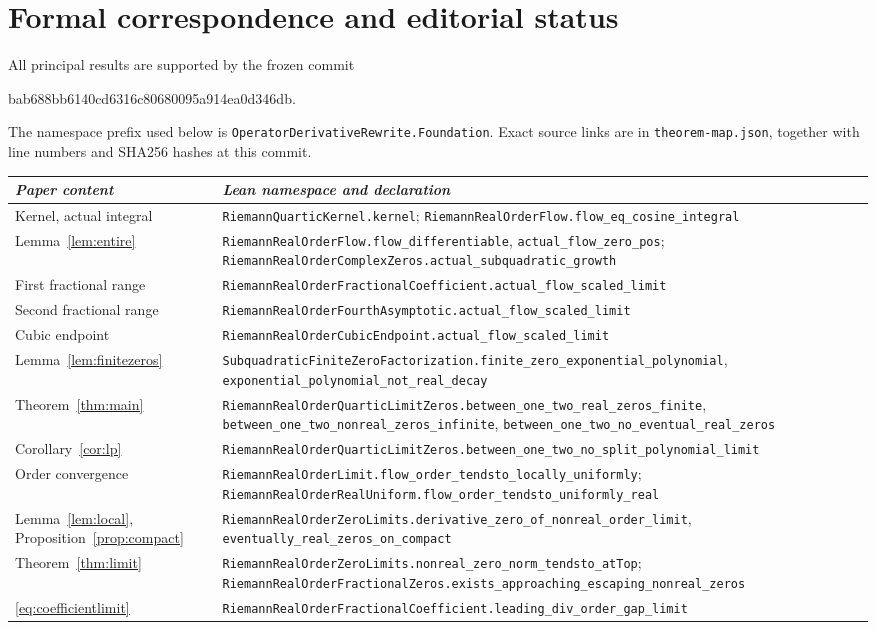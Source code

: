 \documentclass[11pt]{article}
\theoremstyle{remark}\newtheorem{remark}[theorem]{Remark}
\newcommand{\code}[1]{{\small\nolinkurl{#1}}}
\begin{document}
\section{Formal correspondence and editorial status}
All principal results are supported by the frozen commit
\begin{center}\small\ttfamily
bab688bb6140cd6316c80680095a914ea0d346db.
\end{center}
The namespace prefix used below is
\code{OperatorDerivativeRewrite.Foundation}.
Exact source links are in \code{theorem-map.json}, together with
line numbers and SHA256 hashes at this commit.

\begin{longtable}{@{}p{}p{}@{}}
\textit{Paper content}&\textit{Lean namespace and declaration}\\\hline
Kernel, actual integral&\code{RiemannQuarticKernel.kernel};
\code{RiemannRealOrderFlow.flow_eq_cosine_integral}\\[3pt]
Lemma~\ref{lem:entire}&\code{RiemannRealOrderFlow.flow_differentiable},
\code{actual_flow_zero_pos};
\code{RiemannRealOrderComplexZeros.actual_subquadratic_growth}\\[3pt]
First fractional range&\code{RiemannRealOrderFractionalCoefficient.actual_flow_scaled_limit}\\[3pt]
Second fractional range&\code{RiemannRealOrderFourthAsymptotic.actual_flow_scaled_limit}\\[3pt]
Cubic endpoint&\code{RiemannRealOrderCubicEndpoint.actual_flow_scaled_limit}\\[3pt]
Lemma~\ref{lem:finitezeros}&\code{SubquadraticFiniteZeroFactorization.finite_zero_exponential_polynomial},
\code{exponential_polynomial_not_real_decay}\\[3pt]
Theorem~\ref{thm:main}&\code{RiemannRealOrderQuarticLimitZeros.between_one_two_real_zeros_finite},
\code{between_one_two_nonreal_zeros_infinite},
\code{between_one_two_no_eventual_real_zeros}\\[3pt]
Corollary~\ref{cor:lp}&\code{RiemannRealOrderQuarticLimitZeros.between_one_two_no_split_polynomial_limit}\\[3pt]
Order convergence&\code{RiemannRealOrderLimit.flow_order_tendsto_locally_uniformly};
\code{RiemannRealOrderRealUniform.flow_order_tendsto_uniformly_real}\\[3pt]
Lemma~\ref{lem:local}, Proposition~\ref{prop:compact}&\code{RiemannRealOrderZeroLimits.derivative_zero_of_nonreal_order_limit},
\code{eventually_real_zeros_on_compact}\\[3pt]
Theorem~\ref{thm:limit}&\code{RiemannRealOrderZeroLimits.nonreal_zero_norm_tendsto_atTop};
\code{RiemannRealOrderFractionalZeros.exists_approaching_escaping_nonreal_zeros}\\[3pt]
\eqref{eq:coefficientlimit}&\code{RiemannRealOrderFractionalCoefficient.leading_div_order_gap_limit}\\
\end{longtable}
\end{document}
